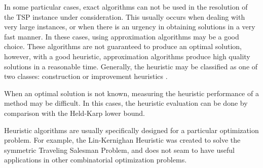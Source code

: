 In some particular cases, exact algorithms can not be used in the resolution of the TSP instance under consideration. This usually occurs when dealing with very large instances, or when there is an urgency in obtaining solutions in a very fast manner. In these cases, using approximation algorithms may be a good choice. These algorithms are not guaranteed to produce an optimal solution,
however, with a good heuristic, approximation algorithms produce high quality solutions in a reasonable time. Generally, the heuristic may be classified as one of two classes: construction or improvement heuristics \cite{heuristics_tsp}.

When an optimal solution is not known, measuring the heuristic performance of a method may be difficult. In this cases, the heuristic evaluation can be done by comparison with the Held-Karp lower bound.

Heuristic algorithms are usually specifically designed for a particular optimization problem. For example, the Lin-Kernighan Heuristic was created to solve the symmetric Traveling Salesman Problem, and does not seam to have useful applications in other combinatorial optimization problems.